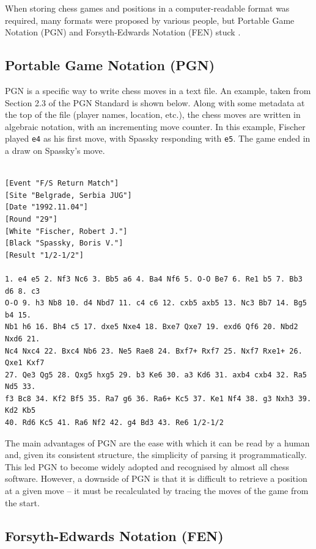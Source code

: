 When storing chess games and positions in a computer-readable format was
required, many formats were proposed by various people, but Portable Game
Notation (PGN) and Forsyth-Edwards Notation (FEN) stuck \citep{pgnNotation}.

\subsection{Portable Game Notation (PGN)}

PGN is a specific way to write chess moves in a text file. An example, taken
from Section 2.3 of the PGN Standard \citep{pgnNotation} is shown below. Along
with some metadata at the top of the file (player names, location, etc.\@), the
chess moves are written in algebraic notation, with an incrementing move
counter. In this example, Fischer played \texttt{e4} as his first move, with
Spassky responding with \texttt{e5}. The game ended in a draw on Spassky's
 move.

\begin{verbatim}

[Event "F/S Return Match"]
[Site "Belgrade, Serbia JUG"]
[Date "1992.11.04"]
[Round "29"]
[White "Fischer, Robert J."]
[Black "Spassky, Boris V."]
[Result "1/2-1/2"]

1. e4 e5 2. Nf3 Nc6 3. Bb5 a6 4. Ba4 Nf6 5. O-O Be7 6. Re1 b5 7. Bb3 d6 8. c3
O-O 9. h3 Nb8 10. d4 Nbd7 11. c4 c6 12. cxb5 axb5 13. Nc3 Bb7 14. Bg5 b4 15.
Nb1 h6 16. Bh4 c5 17. dxe5 Nxe4 18. Bxe7 Qxe7 19. exd6 Qf6 20. Nbd2 Nxd6 21.
Nc4 Nxc4 22. Bxc4 Nb6 23. Ne5 Rae8 24. Bxf7+ Rxf7 25. Nxf7 Rxe1+ 26. Qxe1 Kxf7
27. Qe3 Qg5 28. Qxg5 hxg5 29. b3 Ke6 30. a3 Kd6 31. axb4 cxb4 32. Ra5 Nd5 33.
f3 Bc8 34. Kf2 Bf5 35. Ra7 g6 36. Ra6+ Kc5 37. Ke1 Nf4 38. g3 Nxh3 39. Kd2 Kb5
40. Rd6 Kc5 41. Ra6 Nf2 42. g4 Bd3 43. Re6 1/2-1/2 

\end{verbatim}

The main advantages of PGN are the ease with which it can be read by a human
\citep{pgnNotation} and, given its consistent structure, the simplicity of
parsing it programmatically. This led PGN to become widely adopted and
recognised by almost all chess software. However, a downside of PGN is that it
is difficult to retrieve a position at a given move -- it must be recalculated
by tracing the moves of the game from the start.

\subsection{Forsyth-Edwards Notation (FEN)}\label{fenSection}

